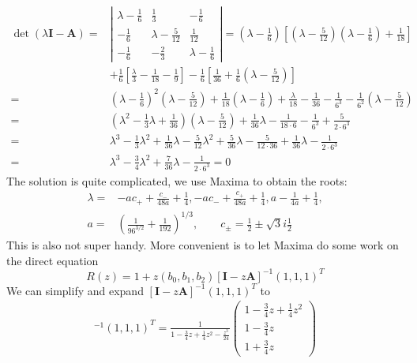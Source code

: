 \documentclass[10pt,a4paper]{article}
\newcommand{\half}[0]{\frac{1}{2}}
\newcommand{\bvec}[1]{\mathbf{#1}}
\begin{document}
\begin{align*}
  \det (\lambda \bvec{I} - \bvec{A}) =& \left| \begin{matrix}
    \lambda - \frac{1}{6} & \frac{1}{3} & -\frac{1}{6} \\
    -\frac{1}{6} & \lambda - \frac{5}{12} & \frac{1}{12} \\
    -\frac{1}{6} & -\frac{2}{3} & \lambda - \frac{1}{6}
  \end{matrix}
  \right| = (\lambda - \frac{1}{6}) \left[ (\lambda - \frac{5}{12})(\lambda - \frac{1}{6}) + \frac{1}{18} \right] \\
                                      & + \frac{1}{6}\left[\frac{\lambda}{3} - \frac{1}{18} - \frac{1}{9}\right] - \frac{1}{6}\left[ \frac{1}{36} + \frac{1}{6}(\lambda - \frac{5}{12}) \right] \\
  =& (\lambda - \frac{1}{6})^2(\lambda - \frac{5}{12}) + \frac{1}{18}(\lambda - \frac{1}{6}) + \frac{\lambda}{18} - \frac{1}{36} - \frac{1}{6^3} - \frac{1}{6^2}(\lambda - \frac{5}{12}) \\
  =& (\lambda^2 - \frac{1}{3}\lambda + \frac{1}{36})(\lambda - \frac{5}{12}) + \frac{1}{36}\lambda - \frac{1}{18\cdot 6} - \frac{1}{6^3} + \frac{5}{2\cdot 6^3} \\
  =& \lambda^3 - \frac{1}{3}\lambda^2 + \frac{1}{36}\lambda - \frac{5}{12}\lambda^2 + \frac{5}{36}\lambda - \frac{5}{12\cdot 36} + \frac{1}{36}\lambda - \frac{1}{2\cdot 6^3} \\
  =& \lambda^3 - \frac{3}{4}\lambda^2 + \frac{7}{36}\lambda - \frac{1}{2\cdot 6^3} = 0
\end{align*}
The solution is quite complicated, we use Maxima to obtain the roots:
\begin{align*}
  \lambda =& -ac_+ + \frac{c_-}{48a} + \frac{1}{4}, -ac_- + \frac{c_+}{48a}  + \frac{1}{4}, a - \frac{1}{4a} + \frac{1}{4}, \\
  a =& \left(\frac{1}{96^{3/2}} + \frac{1}{192}\right)^{1/3}, \qquad
c_\pm = \half \pm \sqrt{3}i\half
\end{align*}
This is also not super handy. More convenient is to let Maxima do some work on the direct equation
\begin{equation*}
  R(z) = 1 + z \left(b_0, b_1, b_2\right)\left[\bvec{I} - z \bvec{A}\right]^{-1}\left(1, 1, 1\right)^T
\end{equation*}
We can simplify and expand $[\bvec{I}-z\bvec{A}]^{-1}(1,1,1)^T$ to
\begin{align*}
  [\bvec{I}-z\bvec{A}]^{-1}(1,1,1)^T = \frac{1}{1 - \frac{3}{4}z + \frac{1}{4}z^2 - \frac{z^3}{24}}\begin{pmatrix}
    1 - \frac{3}{4}z + \frac{1}{4}z^2 \\
    1 - \frac{3}{4}z \\
    1 + \frac{3}{4}z
    \end{pmatrix}
\end{align*}
\end{document}
